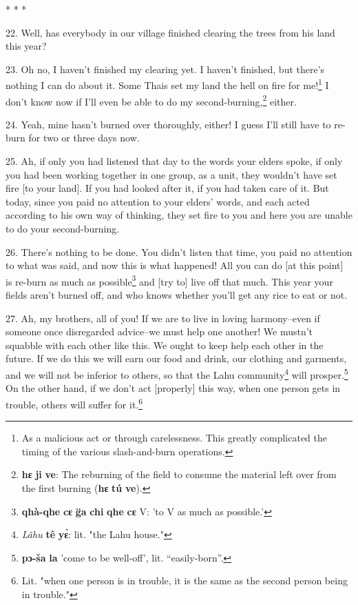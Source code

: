 \begin{center}
* * *
\end{center}

22. Well, has everybody in our village finished clearing the trees from his land
this year?

23. Oh no, I haven't finished my clearing yet. I haven't finished, but there's
nothing I can do about it. Some Thais set my land the hell on fire for me!\footnote{As a malicious act or through carelessness. This greatly complicated the timing of the various slash-and-burn operations.}
I don't know now if I'll even be able to do my second-burning,\footnote{\textbf{hɛ} \textbf{ji} \textbf{ve}: The reburning of the field to consume the material left over from the first burning (\textbf{hɛ} \textbf{tú} \textbf{ve}).} either.

24. Yeah, mine hasn't burned over thoroughly, either! I guess I'll still have to
re-burn for two or three days now.

25. Ah, if only you had listened that day to the words your elders spoke, if only
you had been working together in one group, as a unit, they wouldn't have set fire
[to your land]. If you had looked after it, if you had taken care of it. But today,
since you paid no attention to your elders' words, and each acted according to
his own way of thinking, they set fire to you and here you are unable to do your
second-burning.

26. There's nothing to be done. You didn't listen that time, you paid no attention
to what was said, and now this is what happened! All you can do [at this point]
is re-burn as much as possible\footnote{\textbf{qhà-qhe} \textbf{cɛ} \textbf{g̈a} \textbf{chi} \textbf{qhe} \textbf{cɛ} V: 'to V as much as possible.'} and [try to] live off that much. This year your
fields aren't burned off, and who knows whether you'll get any rice to eat or not.

27. Ah, my brothers, all of you! If we are to live in loving harmony--even if
someone once disregarded advice--we must help one another! We mustn't squabble
with each other like this. We ought to keep help each other in the future. If we
do this we will earn our food and drink, our clothing and garments, and we will
not be inferior to others, so that the Lahu community\footnote{\textit{ Lâh}\textit{\emph{u}} \textbf{tê} \textbf{yɛ̀}: lit. "the Lahu house."} will prosper.\footnote{\textbf{pɔ-ša} \textbf{la} 'come to be well-off', lit. ``easily-born''.} On
the other hand, if we don't act [properly] this way, when one person gets in trouble,
others will suffer for it.\footnote{Lit. "when one person is in trouble, it is the same as the second person being in trouble."}

